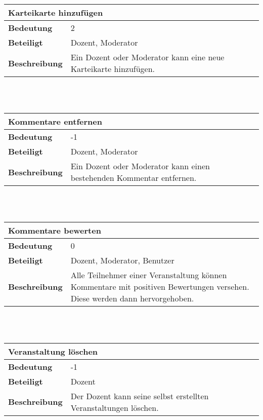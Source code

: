 \documentclass[12pt,a4paper]{article}
\begin{document}
\begin{tabular}{l p{10cm}}
\multicolumn{2}{l}{\textbf{Karteikarte hinzufügen}} \\ \hline
\textbf{Bedeutung} & 2 \\ \hline 
\textbf{Beteiligt} & Dozent, Moderator \\ \hline 
\textbf{Beschreibung} & Ein Dozent oder Moderator kann eine neue Karteikarte hinzufügen.\\ 
\hline 
\end{tabular}\\\\

\begin{tabular}{l p{10cm}}
\multicolumn{2}{l}{\textbf{Kommentare entfernen}} \\ \hline
\textbf{Bedeutung} & -1 \\ \hline 
\textbf{Beteiligt} & Dozent, Moderator \\ \hline 
\textbf{Beschreibung} & Ein Dozent oder Moderator kann einen bestehenden Kommentar entfernen.\\ 
\hline 
\end{tabular}\\\\

\begin{tabular}{l p{10cm}}
\multicolumn{2}{l}{\textbf{Kommentare bewerten}} \\ \hline
\textbf{Bedeutung} & 0 \\ \hline 
\textbf{Beteiligt} & Dozent, Moderator, Benutzer \\ \hline 
\textbf{Beschreibung} & Alle Teilnehmer einer Veranstaltung können Kommentare mit positiven Bewertungen versehen. Diese werden dann hervorgehoben.\\ 
\hline 
\end{tabular}\\\\

\begin{tabular}{l p{10cm}}
\multicolumn{2}{l}{\textbf{Veranstaltung löschen}} \\ \hline
\textbf{Bedeutung} & -1 \\ \hline 
\textbf{Beteiligt} & Dozent \\ \hline 
\textbf{Beschreibung} & Der Dozent kann seine selbst erstellten Veranstaltungen löschen.\\ 
\hline 
\end{tabular}\\\\
\end{document}
